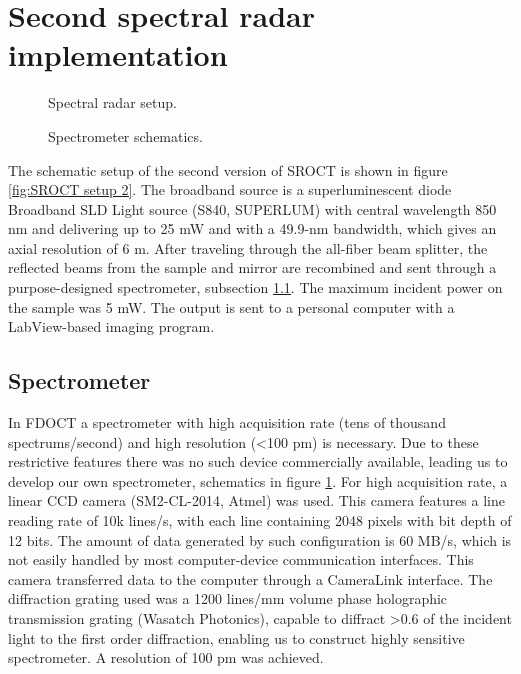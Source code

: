 \documentclass[12pt,twoside,english]{book}
\renewcommand{\~}{\perispomeni}%
\DeclareRobustCommand{\textgreek}[1]{\leavevmode{\greektext #1}}
\numberwithin{equation}{section}
\numberwithin{figure}{section}
\begin{document}
\section{Second spectral radar implementation}
\begin{figure}[h]
\small
\begin{minipage}[t]{0.48\textwidth}

\caption{Spectral radar setup.}
\label{fig:SROCT setup 2}
\end{minipage}
\hfill
\begin{minipage}[t]{0.48\textwidth}

\caption{Spectrometer schematics.}
\label{fig:spectrometer}
\end{minipage}
\end{figure}
The schematic setup of the second version of SROCT is shown in figure \ref{fig:SROCT setup 2}.  The broadband source is a superluminescent diode Broadband SLD Light source (S840, SUPERLUM) with central wavelength 850 nm and delivering up to 25 mW and with a 49.9-nm bandwidth, which gives an axial resolution of 6 \textgreek{m}m. After traveling through the all-fiber beam splitter, the reflected beams from the sample and mirror are recombined and sent through a purpose-designed spectrometer, subsection \ref{sub:spectrometer}. The maximum incident power on the sample was 5 mW. The output is sent to a personal computer with a LabView-based imaging program. 

\subsection{Spectrometer}
\label{sub:spectrometer}
In FDOCT a spectrometer with high acquisition rate (tens of thousand spectrums/second) and high resolution (<100 pm) is necessary. Due to these restrictive features there was no such device commercially available, leading us to develop our own spectrometer, schematics in figure \ref{fig:spectrometer}. For high acquisition rate, a linear CCD camera (SM2-CL-2014, Atmel) was used. This camera features a line reading rate of 10k lines/s, with each line containing 2048 pixels with bit depth of 12 bits. The amount of data generated by such configuration is 60 MB/s, which is not easily handled by most computer-device communication interfaces. This camera transferred data to the computer through a CameraLink interface. The diffraction grating used was a 1200 lines/mm volume phase holographic transmission grating (Wasatch Photonics), capable to diffract >0.6 of the incident light to the first order diffraction, enabling us to construct highly sensitive spectrometer. A resolution of 100 pm was achieved.
\end{document}
